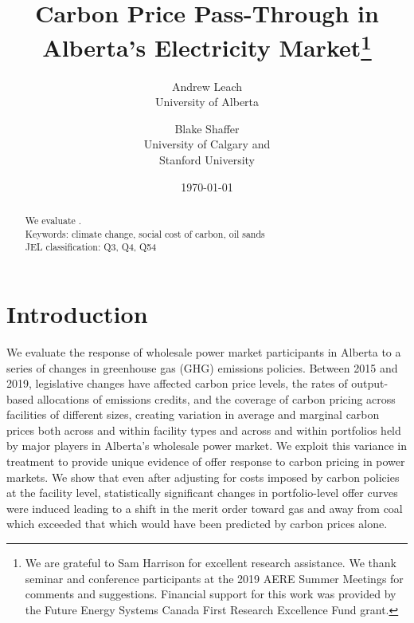 \documentclass[12pt]{article}
\title{Carbon Price Pass-Through in Alberta's Electricity Market\thanks{We are grateful to Sam Harrison for excellent
research assistance. We thank seminar and conference participants at the 2019 AERE Summer Meetings for comments and suggestions. Financial support for this work was provided by the Future Energy Systems Canada First Research Excellence Fund grant.
}
}
\date{\today}
\author{Andrew Leach\\
 University of Alberta
 \and
Blake Shaffer\\University of Calgary and\\Stanford University
}
\begin{document}
\maketitle

\begin{abstract}
\noindent We evaluate .\\
\vspace{0.2in}
\noindent Keywords: climate change, social cost of carbon, oil sands\\
JEL classification: Q3, Q4, Q54
\end{abstract}

\thispagestyle{empty}
\newpage
\onehalfspacing


\section{Introduction}

We evaluate the response of wholesale power market participants in Alberta to a series of changes in greenhouse gas (GHG) emissions policies.  Between 2015 and 2019, legislative changes have affected carbon price levels, the rates of output-based allocations of emissions credits, and the coverage of carbon pricing across facilities of different sizes, creating variation in average and marginal carbon prices both across and within facility types and across and within portfolios held by major players in Alberta's wholesale power market. We exploit this variance in treatment to provide unique evidence of offer response to carbon pricing in power markets. We show that even after adjusting for costs imposed by carbon policies at the facility level, statistically significant changes in portfolio-level offer curves were induced leading to a shift in the merit order toward gas and away from coal which exceeded that which would have been predicted by carbon prices alone.
\end{document}
